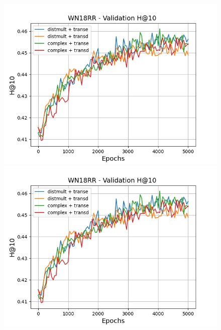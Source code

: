 \begin{figure}
    \centering
    \begin{minipage}{.5\textwidth}
      \centering
      \includegraphics[width=\linewidth]{figures/results/gan_train/pretrained/random/wn18rr/gan_train_random_wn18rr_hit10s.png}
    \end{minipage}%
    \begin{minipage}{.5\textwidth}
      \centering
      \includegraphics[width=\linewidth]{figures/results/gan_train/pretrained/random/wn18rr/gan_train_random_wn18rr_hit10s.png}
    \end{minipage}
    

\end{figure}
